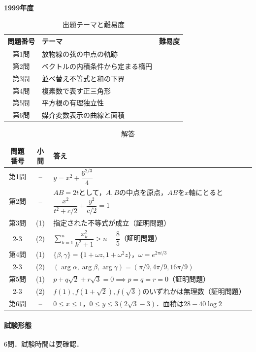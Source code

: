 \documentclass[../../main.tex]{subfiles}
\begin{document}
\begin{center}
  {\fontsize{48pt}{58pt}\selectfont \textbf{1999}\normalsize\textbf{年度}}
\end{center}

\begin{table}[htb]
  \centering
  \caption{出題テーマと難易度}
  \begin{tabular}{|c|p{9cm}|c|}
    \hline
    \textbf{問題番号} & \textbf{テーマ} & \textbf{難易度} \\
    \hline
    第1問 & 放物線の弦の中点の軌跡 & \\
    \hline
    第2問 & ベクトルの内積条件から定まる楕円 & \\
    \hline
    第3問 & 並べ替え不等式と和の下界 & \\
    \hline
    第4問 & 複素数で表す正三角形 & \\
    \hline
    第5問 & 平方根の有理独立性 & \\
    \hline
    第6問 & 媒介変数表示の曲線と面積 & \\
    \hline
  \end{tabular}
\end{table}

\begin{table}[htb]
  \centering
  \caption{解答}
  \renewcommand{\arraystretch}{1.4}
  \begin{tabular}{|c|c|p{9cm}|}
    \hline
    \textbf{問題番号} & \textbf{小問} & \textbf{答え} \\
    \hline
    第1問 & -- & $y=x^2+\dfrac{6^{2/3}}{4}$ \\
    \hline
    第2問 & -- & $AB=2t$として，$A,B$の中点を原点，$AB$を$x$軸にとると$\dfrac{x^2}{t^2+c/2}+\dfrac{y^2}{c/2}=1$ \\
    \hline
    第3問 & (1) & 指定された不等式が成立（証明問題） \\
    \cline{2-3}
    & (2) & $\sum_{k=1}^n\dfrac{x_k^2}{k^2+1}>n-\dfrac{8}{5}$（証明問題） \\
    \hline
    第4問 & (1) & $\{\beta,\gamma\}=\{1+\omega z,1+\omega^2z\}$，$\omega=e^{2\pi i/3}$ \\
    \cline{2-3}
    & (2) & $(\arg\alpha,\arg\beta,\arg\gamma)=(\pi/9,4\pi/9,16\pi/9)$ \\
    \hline
    第5問 & (1) & $p+q\sqrt{2}+r\sqrt{3}=0\implies p=q=r=0$（証明問題） \\
    \cline{2-3}
    & (2) & $f(1),f(1+\sqrt{2}),f(\sqrt{3})$のいずれかは無理数（証明問題） \\
    \hline
    第6問 & -- & $0\le x\le1$，$0\le y\le3(2\sqrt{3}-3)$．面積は$28-40\log2$ \\
    \hline
  \end{tabular}
\end{table}

\paragraph{試験形態}
6問．試験時間は要確認．
\end{document}
